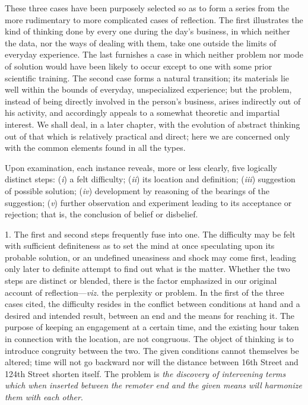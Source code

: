 \documentclass[showtrims,ustradepaper]{memoir}
\begin{document}
These three cases have been purposely selected so as to form a series
from the more rudimentary to more complicated cases of reflection. The
first illustrates the kind of thinking done by every one during the
day's business, in which neither the data, nor the ways of dealing with
them, take one outside the limits of everyday experience. The last
furnishes a case in which neither problem nor mode of solution would
have been likely to occur except to one with some prior scientific
training. The second case forms a natural transition; its materials lie
well within the bounds of everyday, unspecialized experience; but the
problem, instead of being directly involved in the person's business,
arises indirectly out of his activity, and accordingly appeals to a
somewhat theoretic and impartial interest.
We
shall deal, in a later chapter, with the evolution of abstract thinking
out of that which is relatively practical and direct; here we are
concerned only with the common elements found in all the types.


Upon examination, each instance reveals, more or less clearly, five
logically distinct steps: (\emph{i}) a felt difficulty; (\emph{ii}) its
location and definition; (\emph{iii}) suggestion of possible solution;
(\emph{iv}) development by reasoning of the bearings of the suggestion;
(\emph{v}) further observation and experiment leading to its acceptance
or rejection; that is, the conclusion of belief or disbelief.



1. The first and second steps frequently fuse into one. The difficulty
may be felt with sufficient definiteness as to set the mind at once
speculating upon its probable solution, or an undefined uneasiness and
shock may come first, leading only later to definite attempt to find out
what is the matter. Whether the two steps are distinct or blended, there
is the factor emphasized in our original account of
reflection---\emph{viz.} the perplexity or problem. In the first of the
three cases cited, the difficulty resides in the conflict between
conditions at hand and a desired and intended result, between an end and
the means for reaching it. The purpose of keeping an engagement at a
certain time, and the existing hour taken in connection with the
location, are not congruous. The object of thinking is to introduce
congruity between the two. The given conditions cannot themselves be
altered; time will not go backward nor will the distance between 16th
Street and 124th Street shorten itself. The problem is \emph{the
discovery of intervening terms which when inserted between the remoter
end and the given means will harmonize them with each
other}.
\end{document}
